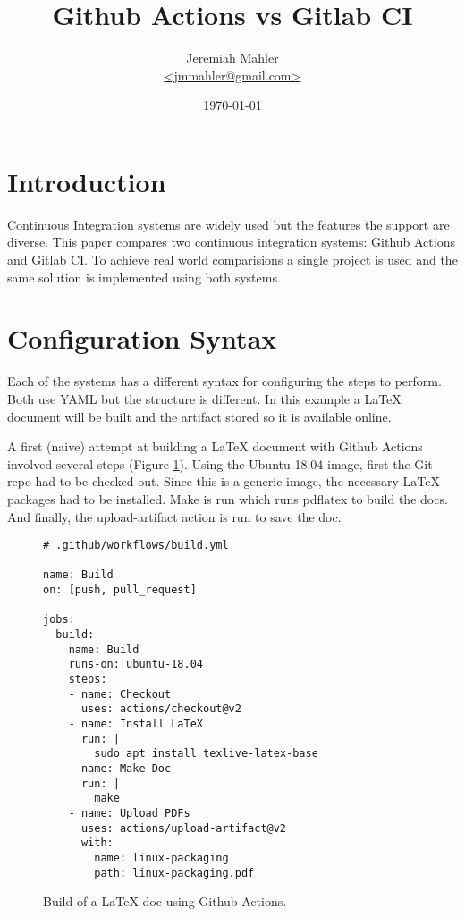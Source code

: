 \documentclass{article}
\begin{document}
\title{Github Actions vs Gitlab CI}
\author{
	\Large{Jeremiah Mahler}\\
	\small{\href{mailto:jmmahler@gmail.com}{\textless jmmahler@gmail.com\textgreater}}
}
\date{\today}
\maketitle

\thispagestyle{empty}
\tableofcontents

\section{Introduction}

Continuous Integration systems are widely used but the features
the support are diverse.
This paper compares two continuous integration systems: Github
Actions\autocite{github-actions} and Gitlab CI\autocite{gitlab-ci}.
To achieve real world comparisions a single project is used and
the same solution is implemented using both systems.

\section{Configuration Syntax}

Each of the systems has a different syntax for configuring the
steps to perform.
Both use YAML but the structure is different.
In this example a LaTeX document will be built and the artifact
stored so it is available online.

A first (naive) attempt at building a LaTeX document with Github Actions
involved several steps
(Figure
\ref{fig:github-actions-build})\autocite{github-jmahler-resume-build.yml}\autocite{github-resume-build-91697435}.
Using the Ubuntu 18.04 image, first the Git repo had to be checked out.
Since this is a generic image, the necessary LaTeX packages had
to be installed.
Make is run which runs pdflatex to build the docs.
And finally, the upload-artifact action is run to save the doc.

\begin{figure}[!ht]
\begin{lstlisting}
# .github/workflows/build.yml

name: Build
on: [push, pull_request]

jobs:
  build:
    name: Build
    runs-on: ubuntu-18.04
    steps:
    - name: Checkout
      uses: actions/checkout@v2
    - name: Install LaTeX
      run: |
        sudo apt install texlive-latex-base
    - name: Make Doc
      run: |
        make
    - name: Upload PDFs
      uses: actions/upload-artifact@v2
      with:
        name: linux-packaging
        path: linux-packaging.pdf
\end{lstlisting}
\label{fig:github-actions-build}
\caption{Build of a LaTeX doc using Github Actions.}
\end{figure}
\end{document}
